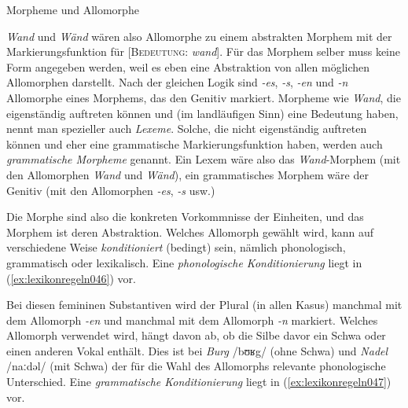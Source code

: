 \begin{Vertiefung}{Morpheme und Allomorphe}

\textit{Wand} und \textit{Wänd} wären also Allomorphe zu einem abstrakten Morphem mit der Markierungsfunktion für [\textsc{Bedeutung}: \textit{wand}].
Für das Morphem selber muss keine Form angegeben werden, weil es eben eine Abstraktion von allen möglichen Allomorphen darstellt.
Nach der gleichen Logik sind \textit{-es}, \textit{-s}, \textit{-en} und \textit{-n} Allomorphe eines Morphems, das den Genitiv markiert.
Morpheme wie \textit{Wand}, die eigenständig auftreten können und (im landläufigen Sinn) eine Bedeutung haben, nennt man spezieller auch \textit{Lexeme}.
Solche, die nicht eigenständig auftreten können und eher eine grammatische Markierungsfunktion haben, werden auch \textit{grammatische Morpheme} genannt.
Ein Lexem wäre also das \textit{Wand}-Morphem (mit den Allomorphen \textit{Wand} und \textit{Wänd}), ein grammatisches Morphem wäre der Genitiv (mit den Allomorphen \textit{-es}, \textit{-s} usw.)

Die Morphe sind also die konkreten Vorkommnisse der Einheiten, und das Morphem ist deren Abstraktion.
Welches Allomorph gewählt wird, kann auf verschiedene Weise \textit{konditioniert} (bedingt) sein, nämlich phonologisch, grammatisch oder lexikalisch.
Eine \textit{phonologische Konditionierung} liegt in (\ref{ex:lexikonregeln046}) vor.

\begin{exe}
  \ex{\label{ex:lexikonregeln046}}
  \begin{xlist}
  \end{xlist}
\end{exe}

Bei diesen femininen Substantiven wird der Plural (in allen Kasus) manchmal mit dem Allomorph \textit{-en} und manchmal mit dem Allomorph \textit{-n} markiert.
Welches Allomorph verwendet wird, hängt davon ab, ob die Silbe davor ein Schwa oder einen anderen Vokal enthält.
Dies ist bei \textit{Burg} /bʊʁg/ (ohne Schwa) und \textit{Nadel} /naːdəl/ (mit Schwa) der für die Wahl des Allomorphs relevante phonologische Unterschied.
Eine \textit{grammatische Konditionierung} liegt in (\ref{ex:lexikonregeln047}) vor.


\end{Vertiefung}
